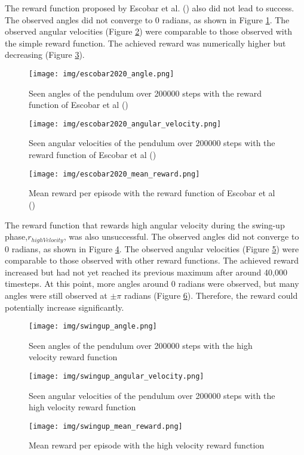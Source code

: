 The reward function proposed by Escobar et al. (\citeyear{manrique_escobar_parametric_2020}) also did not lead to success. The observed angles did not converge to 0 radians, as shown in Figure \ref{fig:angle_escobar2020}. The observed angular velocities (Figure \ref{fig:angle_velocity_escobar2020}) were comparable to those observed with the simple reward function. The achieved reward was numerically higher but decreasing (Figure \ref{fig:mean_reward_escobar2020}).
\begin{figure}[htbp]
    \centering
    \texttt{[image: img/escobar2020\_angle.png]}
    \caption{Seen angles of the pendulum over 200000 steps with the reward function of Escobar et al (\citeyear{manrique_escobar_parametric_2020})}
    \label{fig:angle_escobar2020}
\end{figure}
\begin{figure}[htbp]
    \centering
    \texttt{[image: img/escobar2020\_angular\_velocity.png]}
    \caption{Seen angular velocities of the pendulum over 200000 steps with the reward function of Escobar et al (\citeyear{manrique_escobar_parametric_2020})}
    \label{fig:angle_velocity_escobar2020}
\end{figure}
\begin{figure}[htbp]
    \centering
    \texttt{[image: img/escobar2020\_mean\_reward.png]}
    \caption{Mean reward per episode with the reward function of Escobar et al (\citeyear{manrique_escobar_parametric_2020})}
    \label{fig:mean_reward_escobar2020}
\end{figure}

The reward function that rewards high angular velocity during the swing-up phase,$r_{highVelocity}$, was also unsuccessful. The observed angles did not converge to 0 radians, as shown in Figure \ref{fig:angle_swingup}. The observed angular velocities (Figure \ref{fig:angle_velocity_swingup}) were comparable to those observed with other reward functions. The achieved reward increased but had not yet reached its previous maximum after around 40,000 timesteps. At this point, more angles around 0 radians were observed, but many angles were still observed at $\pm\pi$ radians (Figure \ref{fig:mean_reward_swingup}). Therefore, the reward could potentially increase significantly.
\begin{figure}[htbp]
    \centering
    \texttt{[image: img/swingup\_angle.png]}
    \caption{Seen angles of the pendulum over 200000 steps with the high velocity reward function}
    \label{fig:angle_swingup}
\end{figure}
\begin{figure}[htbp]
    \centering
    \texttt{[image: img/swingup\_angular\_velocity.png]}
    \caption{Seen angular velocities of the pendulum over 200000 steps with the high velocity reward function}
    \label{fig:angle_velocity_swingup}
\end{figure}
\begin{figure}[htbp]
    \centering
    \texttt{[image: img/swingup\_mean\_reward.png]}
    \caption{Mean reward per episode with the high velocity reward function}
    \label{fig:mean_reward_swingup}
\end{figure}

